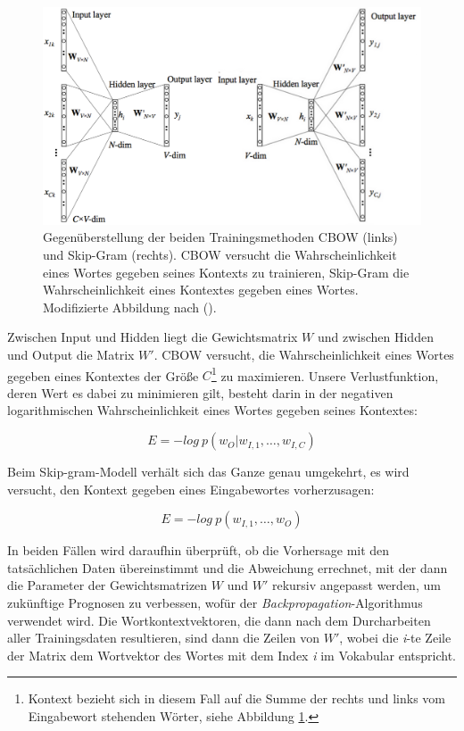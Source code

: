 \begin{figure}[h]
  \centering
  \includegraphics[width=1.1\textwidth]{../img/cbowskip.png}
  \caption[Gegenüberstellung von Skip-Gram und CBOW]{Gegenüberstellung der beiden Trainingsmethoden CBOW (links)
  und Skip-Gram (rechts). CBOW versucht die Wahrscheinlichkeit eines Wortes gegeben seines Kontexts zu trainieren,
  Skip-Gram die Wahrscheinlichkeit eines Kontextes gegeben eines Wortes. Modifizierte Abbildung nach
  (\cite{rong2014word2vec}).\label{fig:cbowskip}}
\end{figure}

Zwischen Input und Hidden liegt die Gewichtsmatrix $W$ und zwischen Hidden und Output die Matrix $W'$.
CBOW versucht, die Wahrscheinlichkeit eines Wortes gegeben eines Kontextes
der Größe $C$\footnote{Kontext bezieht sich in diesem Fall auf die Summe der rechts und links vom Eingabewort stehenden
Wörter, siehe Abbildung \ref{fig:cbowskip}.} zu maximieren. Unsere Verlustfunktion, deren Wert es dabei zu minimieren gilt,
besteht darin in der negativen logarithmischen Wahrscheinlichkeit eines Wortes gegeben seines Kontextes:

\begin{equation}
  E = - log\ p(w_O | w_{I,1}, \ldots, w_{I,C})
\end{equation}

Beim Skip-gram-Modell verhält sich das Ganze genau umgekehrt, es wird versucht, den Kontext gegeben eines Eingabewortes
vorherzusagen:

\begin{equation}
  E = - log\ p(w_{I,1}, \ldots, w_O)
\end{equation}

In beiden Fällen wird daraufhin überprüft, ob die Vorhersage mit den tatsächlichen Daten übereinstimmt und die Abweichung
errechnet, mit der dann die Parameter der Gewichtsmatrizen $W$ und $W'$ rekursiv angepasst werden, um zukünftige Prognosen
zu verbessen, wofür der \emph{Backpropagation}-Algorithmus verwendet wird. Die Wortkontextvektoren, die dann nach dem Durcharbeiten aller Trainingsdaten resultieren, sind dann die Zeilen von
$W'$, wobei die \emph{i}-te Zeile der Matrix dem Wortvektor des Wortes mit dem Index \emph{i} im Vokabular entspricht.\\

